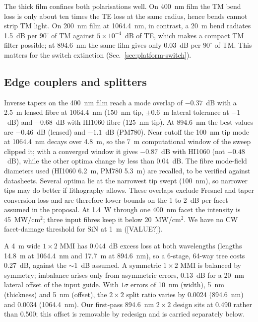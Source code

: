 The thick film confines both polarisations well. On 400~nm film the TM bend loss is only about ten times the TE loss at the same radius, hence bends cannot strip TM light. On 200~nm film at 1064.4~nm, in contrast, a 20~\textmu m bend radiates 1.5~dB per $90^\circ$ of TM against $5\times10^{-4}$~dB of TE, which makes a compact TM filter possible; at 894.6~nm the same film gives only 0.03~dB per $90^\circ$ of TM. This matters for the switch extinction (Sec.~\ref{sec:platform-switch}).

\subsection{Edge couplers and splitters}\label{sec:platform-couplers}

Inverse tapers on the 400~nm film reach a mode overlap of $-0.37$~dB with a 2.5~\textmu m lensed fibre at 1064.4~nm (150~nm tip, $\pm0.6$~\textmu m lateral tolerance at $-1$~dB) and $-0.68$~dB with HI1060 fibre (125~nm tip). At 894.6~nm the best values are $-0.46$~dB (lensed) and $-1.1$~dB (PM780). Near cutoff the 100~nm tip mode at 1064.4~nm decays over 4.8~\textmu m, so the 7~\textmu m computational window of the sweep clipped it; with a converged window it gives $-0.87$~dB with HI1060 (not $-0.48$~dB), while the other optima change by less than 0.04~dB. The fibre mode-field diameters used (HI1060 6.2~\textmu m, PM780 5.3~\textmu m) are recalled, to be verified against datasheets. Several optima lie at the narrowest tip swept (100~nm), so narrower tips may do better if lithography allows. These overlaps exclude Fresnel and taper conversion loss and are therefore lower bounds on the 1 to 2~dB per facet assumed in the proposal. At 1.4~W through one 400~nm facet the intensity is 45~MW/cm$^2$; three input fibres keep it below 20~MW/cm$^2$. We have no CW facet-damage threshold for SiN at 1~\textmu m ([VALUE?]).

A 4~\textmu m wide $1\times2$ MMI has 0.044~dB excess loss at both wavelengths (lengths 14.8~\textmu m at 1064.4~nm and 17.7~\textmu m at 894.6~nm), so a 6-stage, 64-way tree costs 0.27~dB, against the ${\sim}1$~dB assumed. A symmetric $1\times2$ MMI is balanced by symmetry; imbalance arises only from asymmetric errors, 0.13~dB for a 20~nm lateral offset of the input guide. With $1\sigma$ errors of 10~nm (width), 5~nm (thickness) and 5~nm (offset), the $2\times2$ split ratio varies by 0.0024 (894.6~nm) and 0.0034 (1064.4~nm). Our first-pass 894.6~nm $2\times2$ design sits at 0.490 rather than 0.500; this offset is removable by redesign and is carried separately below.

